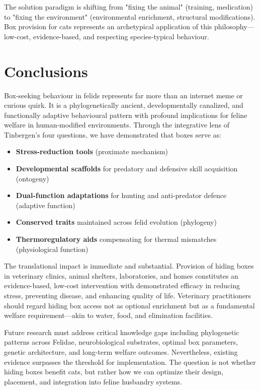 \documentclass[12pt,a4paper]{article}
\begin{document}
The solution paradigm is shifting from "fixing the animal" (training, medication) to "fixing the environment" (environmental enrichment, structural modifications). Box provision for cats represents an archetypical application of this philosophy—low-cost, evidence-based, and respecting species-typical behaviour.

\section{Conclusions}

Box-seeking behaviour in felids represents far more than an internet meme or curious quirk. It is a phylogenetically ancient, developmentally canalized, and functionally adaptive behavioural pattern with profound implications for feline welfare in human-modified environments. Through the integrative lens of Tinbergen's four questions, we have demonstrated that boxes serve as:

\begin{itemize}
    \item \textbf{Stress-reduction tools} (proximate mechanism)
    \item \textbf{Developmental scaffolds} for predatory and defensive skill acquisition (ontogeny)
    \item \textbf{Dual-function adaptations} for hunting and anti-predator defence (adaptive function)
    \item \textbf{Conserved traits} maintained across felid evolution (phylogeny)
    \item \textbf{Thermoregulatory aids} compensating for thermal mismatches (physiological function)
\end{itemize}

The translational impact is immediate and substantial. Provision of hiding boxes in veterinary clinics, animal shelters, laboratories, and homes constitutes an evidence-based, low-cost intervention with demonstrated efficacy in reducing stress, preventing disease, and enhancing quality of life. Veterinary practitioners should regard hiding box access not as optional enrichment but as a fundamental welfare requirement—akin to water, food, and elimination facilities.

Future research must address critical knowledge gaps including phylogenetic patterns across Felidae, neurobiological substrates, optimal box parameters, genetic architecture, and long-term welfare outcomes. Nevertheless, existing evidence surpasses the threshold for implementation. The question is not whether hiding boxes benefit cats, but rather how we can optimize their design, placement, and integration into feline husbandry systems.
\end{document}
